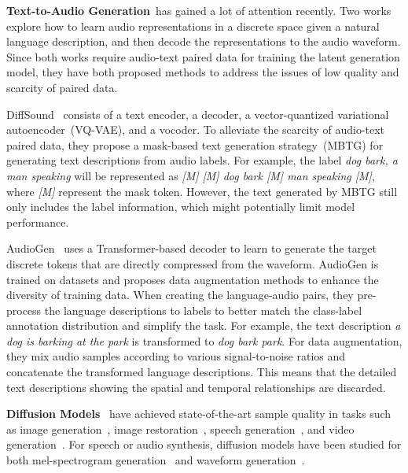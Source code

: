 \documentclass{article}
\begin{document}
\label{TTA}








\textbf{Text-to-Audio Generation}~has gained a lot of attention recently. Two works~\cite{yang2022diffsound,kreuk2022audiogen} explore how to learn audio representations in a discrete space given a natural language description, and then decode the representations to the audio waveform. Since both works require audio-text paired data for training the latent generation model, they have both proposed methods to address the issues of low quality and scarcity of paired data.

DiffSound~\cite{yang2022diffsound} consists of a text encoder, a decoder, a vector-quantized variational autoencoder~(VQ-VAE), and a vocoder. To alleviate the scarcity of audio-text paired data, they propose a mask-based text generation strategy~(MBTG) for generating text descriptions from audio labels. For example, the label \textit{dog bark, a man speaking} will be represented as \textit{[M] [M] dog bark [M] man speaking [M]}, where \textit{[M]} represent the mask token. However, the text generated by MBTG still only includes the label information, which might potentially limit model performance. 


AudioGen~\cite{kreuk2022audiogen} uses a Transformer-based decoder to learn to generate the target discrete tokens that are directly compressed from the waveform. AudioGen is trained on  datasets and proposes data augmentation methods to enhance the diversity of training data. When creating the language-audio pairs, they pre-process the language descriptions to labels to better match the class-label annotation distribution and simplify the task. For example, 
the text description \textit{a dog is barking at the park} is transformed to \textit{dog bark park}. For data augmentation, they mix audio samples according to various signal-to-noise ratios and concatenate the transformed language descriptions. This means that the detailed text descriptions showing the spatial and temporal relationships are discarded.



\textbf{Diffusion Models}~\cite{DDPM, SGM} have achieved state-of-the-art sample quality in tasks such as image generation~\cite{DiffusionBeatsGANs, DALLE2, Imagen}, image restoration~\cite{ISRIR}, speech generation~\cite{WaveGrad, DiffWave, leng2022binauralgrad}, and video generation~\cite{MakeAVideo, ImagenVideo}. For speech or audio synthesis, diffusion models have been studied for both mel-spectrogram generation~\cite{Grad-TTS, ResGrad} and waveform generation~\cite{BDDM, PriorGrad, InferGrad}. 
\end{document}
